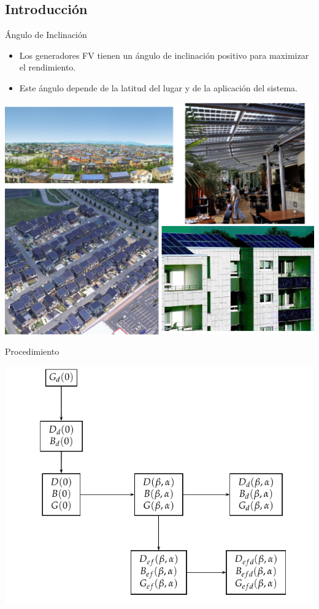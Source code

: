 \documentclass[xcolor={usenames,svgnames,dvipsnames}]{beamer}
\begin{document}
\subsection{Introducción}
\label{sec:org9a2fd92}

\begin{frame}[label={sec:org49a60b0}]{Ángulo de Inclinación}
\begin{itemize}
\item Los generadores FV tienen un ángulo de inclinación positivo para maximizar el rendimiento.
\item Este ángulo depende de la latitud del lugar y de la aplicación del sistema.
\end{itemize}

\begin{center}
\includegraphics[height=0.5\textheight]{../figs/PVUrban.png}
\end{center}
\end{frame}

\begin{frame}[label={sec:org4292a56}]{Procedimiento}
\begin{center}
\includegraphics[width=.9\linewidth]{../figs/ProcedimientoCalculoRadiacionInclinada.pdf}
\end{center}
\end{frame}
\end{document}
